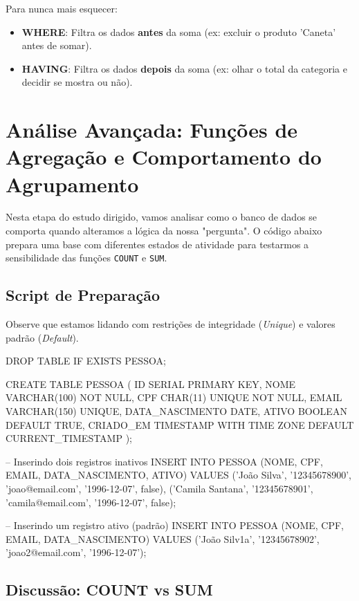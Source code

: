 Para nunca mais esquecer:
\begin{itemize}
    \item \textbf{WHERE}: Filtra os dados \textbf{antes} da soma (ex: excluir o produto 'Caneta' antes de somar).
    \item \textbf{HAVING}: Filtra os dados \textbf{depois} da soma (ex: olhar o total da categoria e decidir se mostra ou não).
\end{itemize}

\section{Análise Avançada: Funções de Agregação e Comportamento do Agrupamento}

Nesta etapa do estudo dirigido, vamos analisar como o banco de dados se comporta quando alteramos a lógica da nossa "pergunta". O código abaixo prepara uma base com diferentes estados de atividade para testarmos a sensibilidade das funções \texttt{COUNT} e \texttt{SUM}.

\subsection{Script de Preparação}

Observe que estamos lidando com restrições de integridade (\textit{Unique}) e valores padrão (\textit{Default}).

\begin{sqlcode}
DROP TABLE IF EXISTS PESSOA;

CREATE TABLE PESSOA (
    ID SERIAL PRIMARY KEY,
    NOME VARCHAR(100) NOT NULL,
    CPF CHAR(11) UNIQUE NOT NULL,
    EMAIL VARCHAR(150) UNIQUE,
    DATA_NASCIMENTO DATE,
    ATIVO BOOLEAN DEFAULT TRUE,
    CRIADO_EM TIMESTAMP WITH TIME ZONE DEFAULT CURRENT_TIMESTAMP
);

-- Inserindo dois registros inativos
INSERT INTO PESSOA (NOME, CPF, EMAIL, DATA_NASCIMENTO, ATIVO)
VALUES ('João Silva', '12345678900', 'joao@email.com', '1996-12-07', false),
       ('Camila Santana', '12345678901', 'camila@email.com', '1996-12-07', false);

-- Inserindo um registro ativo (padrão)
INSERT INTO PESSOA (NOME, CPF, EMAIL, DATA_NASCIMENTO)
VALUES ('João Silv1a', '12345678902', 'joao2@email.com', '1996-12-07');
\end{sqlcode}

\subsection{Discussão: COUNT vs SUM}


